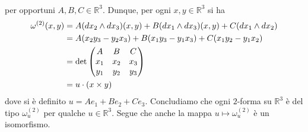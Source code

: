 \documentclass[twoside, 11pt]{amsbook}
\makeatletter
\newcommand{\0}{{(0)}}
\newcommand{\3}{{(3)}}
\theoremstyle{colonplain}
\theoremstyle{colondefinition}
\theoremstyle{colonremark}
\numberwithin{equation}{chapter}
\renewcommand{\proofname}{Dimostrazione}
\renewenvironment{proof}[1][\proofname]{\par
  \pushQED{\qed}%
  \normalfont \topsep6\p@\@plus6\p@\relax
  \trivlist
  \item[\hskip\labelsep\bfseries #1:]\ignorespaces
}{%
  \popQED\endtrivlist\@endpefalse
}
\makeatother
\begin{document}
\begin{proof}
\begin{align}
\end{align}
per opportuni $A, B, C \in \mathbb{R}^3$. Dunque, per ogni $x, y \in \mathbb{R}^3$ si ha 
\begin{align}
    \omega^{(2)}(x, y) &= A(dx_2 \wedge dx_3)(x, y) + B(dx_1 \wedge dx_3)(x, y) + C(dx_1 \wedge dx_2) \notag \\
    &= A(x_2y_3 - y_2x_3) + B(x_1y_3 - y_1x_3) + C(x_1y_2 - y_1x_2) \notag \\
    &= \det\begin{pmatrix}
        A & B & C \\
        x_1 & x_2 & x_3 \\
        y_1 & y_2 & y_3
    \end{pmatrix} \notag \\
    &= u \cdot (x \times y)
\end{align}
dove si è definito $u = Ae_1 + Be_2 + Ce_3$. Concludiamo che ogni $2$-forma su $\mathbb{R}^3$ è del tipo $\omega^{(2)}_u$ per qualche $u \in \mathbb{R}^3$. Segue che anche la mappa $u \mapsto \omega^{(2)}_u$ è un isomorfismo.
\end{proof}
\end{document}
